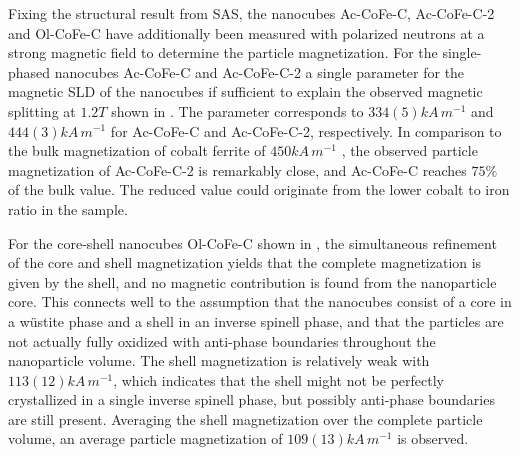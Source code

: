 \documentclass[\main/dresen_thesis.tex]{subfiles}
\begin{document}
    Fixing the structural result from SAS, the nanocubes Ac-CoFe-C, Ac-CoFe-C-2 and Ol-CoFe-C have additionally been measured with polarized neutrons at a strong magnetic field to determine the particle magnetization.
    For the single-phased nanocubes Ac-CoFe-C and Ac-CoFe-C-2 a single parameter for the magnetic SLD of the nanocubes if sufficient to explain the observed magnetic splitting at $1.2 \unit{T}$ shown in .
    The parameter corresponds to $334(5) \unit{kA \, m^{-1}}$ and $444(3) \unit{kA \, m^{-1}}$ for Ac-CoFe-C and Ac-CoFe-C-2, respectively.
    In comparison to the bulk magnetization of cobalt ferrite of $450 \unit{kA \, m^{-1}}$ \cite{Tachiki_1960_Origi}, the observed particle magnetization of Ac-CoFe-C-2 is remarkably close, and Ac-CoFe-C reaches $75 \%$ of the bulk value.
    The reduced value could originate from the lower cobalt to iron ratio in the sample.

    For the core-shell nanocubes Ol-CoFe-C shown in , the simultaneous refinement of the core and shell magnetization yields that the complete magnetization is given by the shell, and no magnetic contribution is found from the nanoparticle core.
    This connects well to the assumption that the nanocubes consist of a core in a w\"ustite phase and a shell in an inverse spinell phase, and that the particles are not actually fully oxidized with anti-phase boundaries throughout the nanoparticle volume.
    The shell magnetization is relatively weak with $113(12) \unit{kA \, m^{-1}}$, which indicates that the shell might not be perfectly crystallized in a single inverse spinell phase, but possibly anti-phase boundaries are still present.
    Averaging the shell magnetization over the complete particle volume, an average particle magnetization of $109(13) \unit{kA\, m^{-1}}$ is observed.
\end{document}
